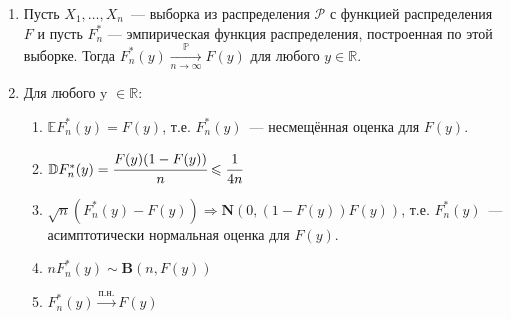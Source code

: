 \begin{namedthm}\leavevmode
\begin{enumerate}
    \item Пусть $X_{1}, \ldots, X_{n}$~--- выборка из распределения $\mathcal{P}$ с функцией распределения $F$ и пусть $F_{n}^{*}$ — эмпирическая функция распределения, построенная по этой выборке. Тогда $F_{n}^{*}(y) \xrightarrow[n \to \infty]{\mathbb{P}} F(y)$ для любого $y \in \mathbb{R}.$
    \item Для любого y $\in \mathbb{R}$:
    \begin{enumerate}[label={\arabic*)}]
        \item $\mathbb{E} F_{n}^{*}(y)=F(y)$, т.е. $F_{n}^{*}(y)$~--- несмещённая оценка для $F(y)$.
        \item $\mathbb{D} F_{n}^{*}(y)=\cfrac{F(y)(1-F(y))}{n} \leqslant \cfrac{1}{4n}$
        \item $\sqrt{n}(F_{n}^{*}(y)-F(y)) \Rightarrow \mathbf{N}(0, (1-F(y))F(y))$, т.е. $F_{n}^{*}(y)$~--- асимптотически нормальная оценка для $F(y)$.
        \item $n F_{n}^{*}(y) \sim \mathbf{B}(n, F(y))$
        \item $F_{n}^{*}(y) \overset{\text{п.н.}}{\rightarrow} F(y)$ 
    \end{enumerate}
\end{enumerate}
\end{namedthm}
